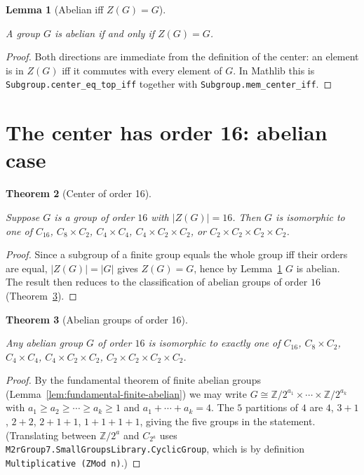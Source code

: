 \documentclass{article}
\newtheorem{theorem}{Theorem}[section]
\newtheorem{lemma}[theorem]{Lemma}
\theoremstyle{definition}
\newcommand{\lean}[1]{}
\newcommand{\leanok}{}
\newcommand{\leanfile}[1]{}
\newcommand{\uses}[1]{}
\begin{document}
\begin{lemma}[Abelian iff $Z(G) = G$]
    \label{lem:abelian-iff-center-top}
    \lean{OrderSixteen.Prelim.abelian_iff_center_top}
    \leanfile{M2rGroup7/SixteenCase.lean}
    \leanok
    A group $G$ is abelian if and only if $Z(G) = G$.
\end{lemma}
\begin{proof}
    Both directions are immediate from the definition of the center: an
    element is in $Z(G)$ iff it commutes with every element of $G$. In
    Mathlib this is \texttt{Subgroup.center\_eq\_top\_iff} together with
    \texttt{Subgroup.mem\_center\_iff}.
\end{proof}

\section{The center has order 16: abelian case}

\begin{theorem}[Center of order 16]
    \label{thm:center-sixteen}
    \lean{OrderSixteen.center_order_sixteen}
    \leanfile{M2rGroup7/SixteenCase.lean}
    \uses{lem:abelian-iff-center-top, thm:abelian-order-sixteen}
    \leanok
    Suppose $G$ is a group of order $16$ with $|Z(G)| = 16$. Then $G$ is
    isomorphic to one of $C_{16}$, $C_8 \times C_2$, $C_4 \times C_4$,
    $C_4 \times C_2 \times C_2$, or $C_2 \times C_2 \times C_2 \times C_2$.
\end{theorem}
\begin{proof}
    \uses{lem:abelian-iff-center-top,thm:abelian-order-sixteen}
    Since a subgroup of a finite group equals the whole group iff their
    orders are equal, $|Z(G)| = |G|$ gives $Z(G) = G$, hence by
    Lemma~\ref{lem:abelian-iff-center-top} $G$ is abelian. The result then
    reduces to the classification of abelian groups of order $16$
    (Theorem~\ref{thm:abelian-order-sixteen}).
\end{proof}

\begin{theorem}[Abelian groups of order 16]
    \label{thm:abelian-order-sixteen}
    \uses{lem:fundamental-finite-abelian}
    Any abelian group $G$ of order $16$ is isomorphic to exactly one of
    $C_{16}$, $C_8 \times C_2$, $C_4 \times C_4$, $C_4 \times C_2 \times C_2$,
    $C_2 \times C_2 \times C_2 \times C_2$.
\end{theorem}
\begin{proof}
    \uses{lem:fundamental-finite-abelian}
    By the fundamental theorem of finite abelian groups
    (Lemma~\ref{lem:fundamental-finite-abelian}) we may write
    $G \cong \mathbb{Z}/2^{a_1} \times \cdots \times \mathbb{Z}/2^{a_k}$ with
    $a_1 \ge a_2 \ge \cdots \ge a_k \ge 1$ and $a_1 + \cdots + a_k = 4$. The
    $5$ partitions of $4$ are $4$, $3+1$, $2+2$, $2+1+1$, $1+1+1+1$, giving
    the five groups in the statement. (Translating between
    $\mathbb{Z}/2^a$ and $C_{2^a}$ uses
    \texttt{M2rGroup7.SmallGroupsLibrary.CyclicGroup}, which is by
    definition \texttt{Multiplicative (ZMod n)}.)
\end{proof}
\end{document}
